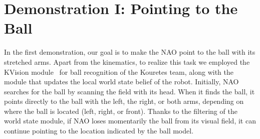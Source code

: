 \newpage


\section{Demonstration I: Pointing to the Ball}

In the first demonstration, our goal is to make the NAO point to the ball with its stretched arms. Apart from the kinematics, to realize this task we employed the KVision module~\cite{orfanoudakis2011} for ball recognition of the Kouretes team, along with the module that updates the local world state belief of the robot. Initially, NAO searches for the ball by scanning the field with its head. When it finds the ball, it points directly to the ball with the left, the right, or both arms, depending on where the ball is located (left, right, or front). Thanks to the filtering of the world state module, if NAO loses momentarily the ball from its visual field, it can continue pointing to the location indicated by the ball model. 


